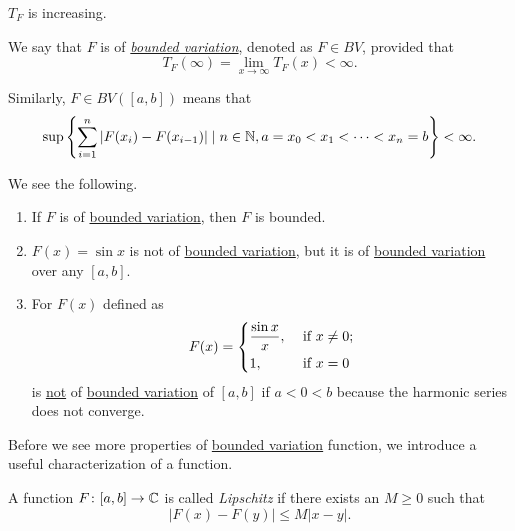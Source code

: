 \begin{remark}
	\(T_F\) is increasing.
\end{remark}

\begin{definition}\label{def:bounded-variation}
	We say that \(F\) is of \emph{\hyperref[def:bounded-variation]{bounded variation}}, denoted as \(F \in BV\), provided that
	\[
		T_F(\infty) = \lim_{x \to \infty} T_F(x) < \infty.
	\]

	Similarly, \(F \in BV([a,b])\) means that
	\[
		\sup \left\{\sum_{i=1}^n \left\vert F(x_i) - F(x_{i-1}) \right\vert \mid n \in \mathbb{\MakeUppercase{n}} , a = x_0 < x_1 < \cdots < x_n = b\right\} < \infty.
	\]
\end{definition}

\begin{remark}
	We see the following.
	\begin{enumerate}[(1)]
		\item If \(F\) is of \hyperref[def:bounded-variation]{bounded variation}, then \(F\) is bounded.
		\item \(F(x) = \sin x\) is not of \hyperref[def:bounded-variation]{bounded variation}, but it is of \hyperref[def:bounded-variation]{bounded variation}
		      over any \([a,b]\).
		\item For \(F(x)\) defined as
		      \[
			      F(x) = \begin{dcases}
				      \frac{\sin x}{x}, & \text{ if } x\neq 0 ; \\
				      1,                & \text{ if } x = 0
			      \end{dcases}
		      \]
		      is \underline{not} of \hyperref[def:bounded-variation]{bounded variation} of \([a,b]\) if \(a < 0 < b\) because the harmonic series does not converge.
	\end{enumerate}
\end{remark}

Before we see more properties of \hyperref[def:bounded-variation]{bounded variation} function, we introduce a useful characterization of a function.
\begin{definition}[Lipschitz]\label{def:Lipschitz}
	A function \(F \colon [a,b] \to \mathbb{\MakeUppercase{c}} \) is called \emph{Lipschitz} if there exists an
	\(M \geq 0\) such that
	\[
		\left\vert F(x) - F(y) \right\vert \leq M \left\vert x - y \right\vert.
	\]
\end{definition}

